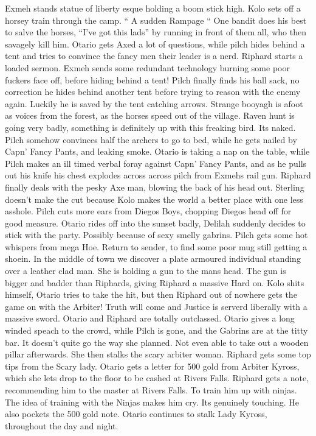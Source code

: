Exmeh stands statue of liberty esque holding a boom stick high.\medskip
Kolo sets off a horsey train through the camp. “ A sudden Rampage “\medskip
One bandit does his best to salve the horses, “I’ve got this lads” by running in front of them all, who then savagely kill him.\medskip
Otario gets Axed a lot of questions, while pilch hides behind a tent and tries to convince the fancy men their leader is a nerd. Riphard starts a loaded sermon. Exmeh sends some redundant technology burning some poor fuckers face off, before hiding behind a tent!\medskip
Pilch finally finds his ball sack, no correction he hides behind another tent before trying to reason with the enemy again. Luckily he is saved by the tent catching arrows. Strange booyagh is afoot as voices from the forest, as the horses speed out of the village.\medskip
Raven hunt is going very badly, something is definitely up with this freaking bird. Its naked.\medskip
Pilch somehow convinces half the archers to go to bed, while he gets nailed by Capn’ Fancy Pants, and leaking smoke.\medskip
Otario is taking a nap on the table, while Pilch makes an ill timed verbal foray against Capn’ Fancy Pants, and as he pulls out his knife his chest explodes across across pilch from Exmehs rail gun.\medskip
Riphard finally deals with the pesky Axe man, blowing the back of his head out.\medskip
Sterling doesn’t make the cut because Kolo makes the world a better place with one less asshole. Pilch cuts more ears from Diegos Boys, chopping Diegos head off for good measure.\medskip
Otario rides off into the sunset badly, Delilah suddenly decides to stick with the party. Possibly because of sexy smelly gabrins.\medskip
Pilch gets some hot whispers from mega Hoe.\medskip
Return to sender, to find some poor mug still getting a shoein.\medskip
In the middle of town we discover a plate armoured individual standing over a leather clad man. She is holding a gun to the mans head. The gun is bigger and badder than Riphards, giving Riphard a massive Hard on.\medskip
Kolo shits himself, Otario tries to take the hit, but then Riphard out of nowhere gets the game on with the Arbiter! Truth will come and Justice is serverd liberally with a massive sword.\medskip
Otario and Riphard are totally outclassed. Otario gives a long winded speach to the crowd, while Pilch is gone, and the Gabrins are at the titty bar. It doesn’t quite go the way she planned. Not even able to take out a wooden pillar afterwards. She then stalks the scary arbiter woman.\medskip
Riphard gets some top tips from the Scary lady. Otario gets a letter for 500 gold from Arbiter Kyross, which she lets drop to the floor to be cashed at Rivers Falls.\medskip
Riphard gets a note, recommending him to the master at Rivers Falls. To train him up with ninjas. The idea of training with the Ninjas makes him cry. Its genuinely touching. He also pockets the 500 gold note.\medskip
Otario continues to stalk Lady Kyross, throughout the day and night.